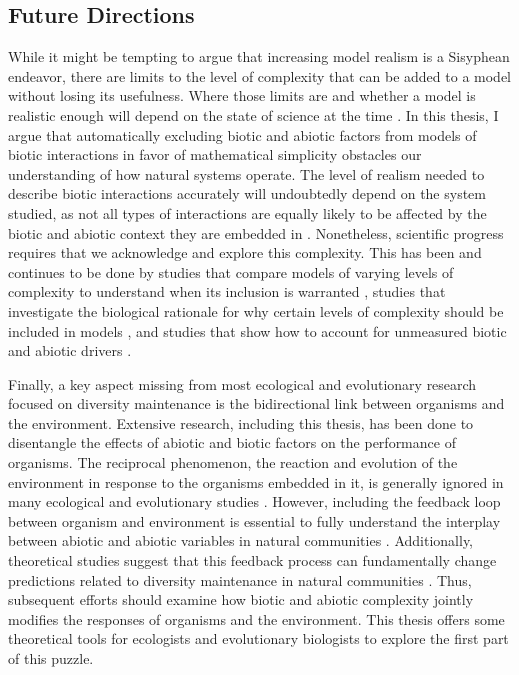 \begin{refsection}


\section*{Future Directions}

While it might be tempting to argue that increasing model realism is a Sisyphean endeavor, there are limits to the level of complexity that can be added to a model without losing its usefulness. Where those limits are and whether a model is realistic enough will depend on the state of science at the time \citep{levins1993response}. In this thesis, I argue that automatically excluding biotic and abiotic factors from models of biotic interactions in favor of mathematical simplicity obstacles our understanding of how natural systems operate. The level of realism needed to describe biotic interactions accurately will undoubtedly depend on the system studied, as not all types of interactions are equally likely to be affected by the biotic and abiotic context they are embedded in \citep{chamberlain_how_2014}. Nonetheless, scientific progress requires that we acknowledge and explore this complexity. This has been and continues to be done by studies that compare models of varying levels of complexity to understand when its inclusion is warranted \citep{lai2020role,martyn2021identifying,bimler_accurate_2018,weiss2021disentangling}, studies that investigate the biological rationale for why certain levels of complexity should be included in models \citep{abrams1983arguments,abrams_nature_2000,letten_mechanistic_2019,stouffer2021hidden,aladwani2019addition}, and studies that show how to account for unmeasured biotic and abiotic drivers \citep{d2018translucent, song_towards_2020}.

Finally, a key aspect missing from most ecological and evolutionary research focused on diversity maintenance is the bidirectional link between organisms and the environment. Extensive research, including this thesis, has been done to disentangle the effects of abiotic and biotic factors on the performance of organisms. The reciprocal phenomenon, the reaction and evolution of the environment in response to the organisms embedded in it, is generally ignored in many ecological and evolutionary studies \citep{levins_dialectics_1980,laland1999evolutionary}. However, including the feedback loop between organism and environment is essential to fully understand the interplay between abiotic and abiotic variables in natural communities \citep{callaway2007positive,hastings2007ecosystem}. Additionally, theoretical studies suggest that this feedback process can fundamentally change predictions related to diversity maintenance in natural communities \citep{kylafis_niche_2011,kylafis2008ecological}. Thus, subsequent efforts should examine how biotic and abiotic complexity jointly modifies the responses of organisms and the environment. This thesis offers some theoretical tools for ecologists and evolutionary biologists to explore the first part of this puzzle.
\printbibliography
\end{refsection}
